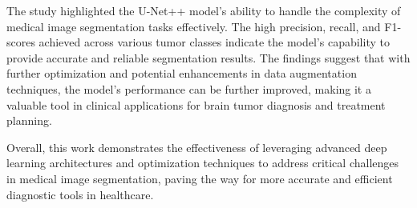 The study highlighted the U-Net++ model's ability to handle the complexity of medical image segmentation tasks effectively. The high precision, recall, and F1-scores achieved across various tumor classes indicate the model's capability to provide accurate and reliable segmentation results. The findings suggest that with further optimization and potential enhancements in data augmentation techniques, the model's performance can be further improved, making it a valuable tool in clinical applications for brain tumor diagnosis and treatment planning.

Overall, this work demonstrates the effectiveness of leveraging advanced deep learning architectures and optimization techniques to address critical challenges in medical image segmentation, paving the way for more accurate and efficient diagnostic tools in healthcare.

